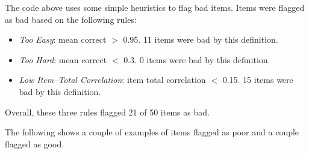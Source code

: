 \documentclass[a4paper]{article}
\begin{document}
The code above uses some simple heuristics to flag bad items.
Items were flagged as bad based on the following rules:

\begin{itemize}
\item \emph{Too Easy}: mean correct $>$
0.95.
11
items were bad by this definition.

\item \emph{Too Hard}: mean correct $<$ 
0.3.
0
items were bad by this definition. 

\item \emph{Low Item--Total Correlation}: item total correlation $<$ 
0.15.
15 
items were bad by this definition. 
\end{itemize}

Overall, these three rules flagged 
21 of 
50 items as bad.


The following shows a couple of examples of items flagged as poor
and a couple flagged as good.
\end{document}
